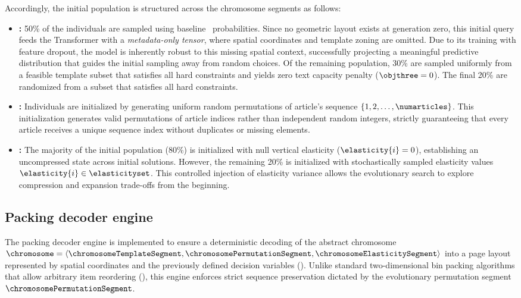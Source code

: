 Accordingly, the initial population is structured across the chromosome segments as follows:
\begin{itemize}
    \item \textbf{\chromosomeTemplateSegment:} 50\% of the individuals are sampled using baseline \neuralmethod\ probabilities. Since no geometric layout exists at generation zero, this initial query feeds the Transformer with a \emph{metadata-only tensor}, where spatial coordinates and template zoning are omitted. Due to its training with feature dropout, the model is inherently robust to this missing spatial context, successfully projecting a meaningful predictive distribution that guides the initial sampling away from random choices. Of the remaining population, 30\% are sampled uniformly from a feasible template subset that satisfies all hard constraints and yields zero text capacity penalty ($\objthree = 0$). The final 20\% are randomized from a subset that satisfies all hard constraints.

    \item \textbf{\chromosomePermutationSegment: } Individuals are initialized by generating uniform random permutations of article's sequence $\{1, 2, \dots, \numarticles\}$.  This initialization generates valid permutations of article indices rather than independent random integers, strictly guaranteeing that every article receives a unique sequence index without duplicates or missing elements.

    \item \textbf{\chromosomeElasticitySegment: } The majority of the initial population (80\%) is initialized with null vertical elasticity ($\elasticity{i} = 0$), establishing an uncompressed state across initial solutions. However, the remaining 20\% is initialized with stochastically sampled elasticity values $\elasticity{i} \in \elasticityset$. This controlled injection of elasticity variance allows the evolutionary search to explore compression and expansion trade-offs from the beginning.
\end{itemize}


\subsection{Packing decoder engine}
\label{sec:packing_engine}

The packing decoder engine is implemented to ensure a deterministic decoding of the abstract chromosome $\chromosome = \langle \chromosomeTemplateSegment, \chromosomePermutationSegment, \chromosomeElasticitySegment \rangle$ into a page layout represented by spatial coordinates and the previously defined decision variables (). Unlike standard two-dimensional bin packing algorithms that allow arbitrary item reordering (), this engine enforces strict sequence preservation dictated by the evolutionary permutation segment $\chromosomePermutationSegment$.

